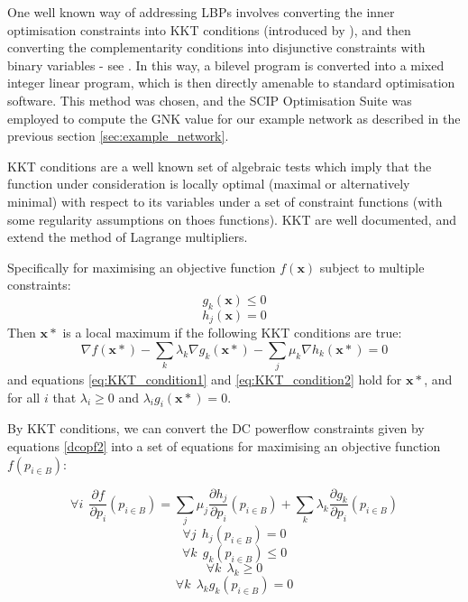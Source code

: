 One well known way of addressing LBPs involves converting the inner optimisation constraints into KKT conditions (introduced by \cite{kuhn1951nonlinear}), and then converting the complementarity conditions into disjunctive constraints with binary variables - see \cite{Fortuny-Amat1981,Pineda2018}.
In this way, a bilevel program is converted into a mixed integer linear program, which is then directly amenable to standard optimisation software.
This method was chosen, and the SCIP Optimisation Suite was employed to compute the GNK value for our example network as described in the previous section \ref{sec:example_network}.

KKT conditions are a well known set of algebraic tests which imply that the function under consideration is locally optimal (maximal or alternatively minimal) with respect to its variables under a set of constraint functions (with some regularity assumptions on thoes functions).
KKT are well documented, and extend the method of Lagrange multipliers.

Specifically for maximising an objective function $f(\mathbf{x})$ subject to multiple constraints:
\begin{equation}\label{eq:KKT_condition1} g_k(\mathbf{x})\le 0 \end{equation}
\begin{equation}\label{eq:KKT_condition2} h_j(\mathbf{x})=0 \end{equation}
Then $\mathbf{x}*$ is a local maximum if the following KKT conditions are true:
\begin{equation}\label{eq:KKT_conditions3} \nabla f(\mathbf{x}*) - \sum_k\lambda_k\nabla g_k(\mathbf{x}*) - \sum_j\mu_k\nabla h_k(\mathbf{x}*) =0\end{equation}
and equations \ref{eq:KKT_condition1} and \ref{eq:KKT_condition2} hold for $\mathbf{x}*$, and for all $i$ that $\lambda_i\ge 0$ and $\lambda_ig_i(\mathbf{x}*)=0$.

By KKT conditions, we can convert the DC powerflow constraints given by equations \ref{dcopf2} into a set of equations for maximising an objective function $f(p_{i\in B})$:

\begin{equation}\forall i~~\frac{\partial f}{\partial p_i}(p_{i\in B})=\sum_j\mu_j\frac{\partial h_j}{\partial p_i}(p_{i\in B}) + \sum_k\lambda_k\frac{\partial g_k}{\partial p_i}(p_{i\in B})\end{equation}
\begin{equation}\forall j~~ h_j(p_{i\in B})=0\end{equation}
\begin{equation}\forall k~~ g_k(p_{i\in B})\le 0\end{equation}
\begin{equation}\forall k~~ \lambda_k \ge 0\end{equation}
\begin{equation}\label{eq:complementarity_constraint_KKT}\forall k~~ \lambda_kg_k(p_{i\in B}) = 0\end{equation}

